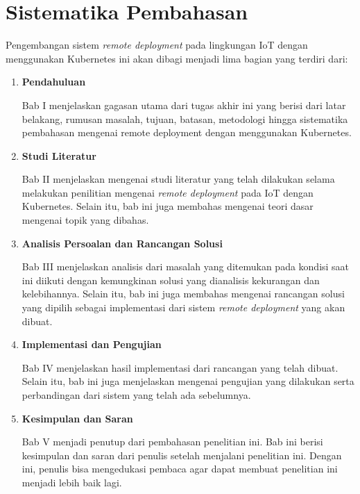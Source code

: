 \section{Sistematika Pembahasan}

Pengembangan sistem \textit{remote deployment} pada lingkungan IoT dengan menggunakan Kubernetes ini akan dibagi menjadi lima bagian yang terdiri dari:

\begin{enumerate}
  \item \textbf{Pendahuluan}

        Bab I menjelaskan gagasan utama dari tugas akhir ini yang berisi dari latar belakang, rumusan masalah, tujuan, batasan, metodologi hingga sistematika pembahasan mengenai remote deployment dengan menggunakan Kubernetes.

  \item \textbf{Studi Literatur}

        Bab II menjelaskan mengenai studi literatur yang telah dilakukan selama melakukan penilitian mengenai \textit{remote deployment} pada IoT dengan Kubernetes. Selain itu, bab ini juga membahas mengenai teori dasar mengenai topik yang dibahas.

  \item \textbf{Analisis Persoalan dan Rancangan Solusi}

        Bab III menjelaskan analisis dari masalah yang ditemukan pada kondisi saat ini diikuti dengan kemungkinan solusi yang dianalisis kekurangan dan kelebihannya. Selain itu, bab ini juga membahas mengenai rancangan solusi yang dipilih sebagai implementasi dari sistem \textit{remote deployment} yang akan dibuat.

  \item \textbf{Implementasi dan Pengujian}


        Bab IV menjelaskan hasil implementasi dari rancangan yang telah dibuat. Selain itu, bab ini juga menjelaskan mengenai pengujian yang dilakukan serta perbandingan dari sistem yang telah ada sebelumnya.

  \item \textbf{Kesimpulan dan Saran}


        Bab V menjadi penutup dari pembahasan penelitian ini. Bab ini berisi kesimpulan dan saran dari penulis setelah menjalani penelitian ini. Dengan ini, penulis bisa mengedukasi pembaca agar dapat membuat penelitian ini menjadi lebih baik lagi.

\end{enumerate}